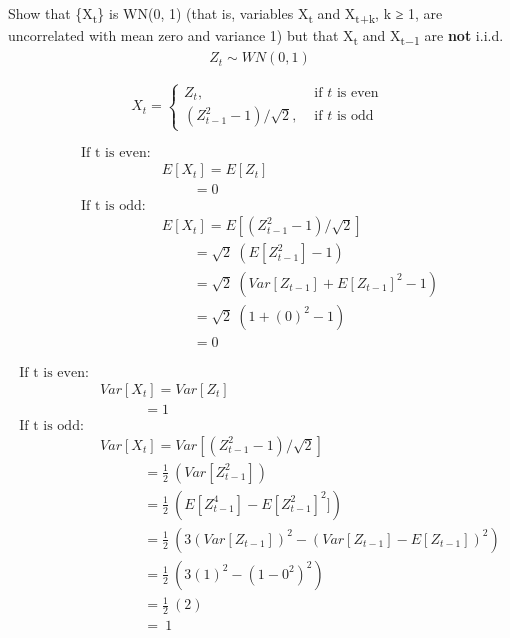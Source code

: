 \documentclass[
]{article}
\begin{document}
\setlength{\leftskip}{0cm}

Show that \{X\textsubscript{t}\} is WN(0, 1) (that is, variables
X\textsubscript{t} and X\textsubscript{t+k}, k ≥ 1, are uncorrelated
with mean zero and variance 1) but that X\textsubscript{t} and
X\textsubscript{t−1} are \textbf{not} i.i.d.\\

\[
\begin{align*}
Z_{t} \sim WN(0, 1)
\end{align*}
\]

\[
X_t= \begin{cases}Z_t, & \text { if } t \text { is even } \\ \left(Z_{t-1}^2-1\right) / \sqrt{2}, & \text { if } t \text { is odd }\end{cases}
\]

\[ 
\begin{align*}
\text{If t is even}:&\\
& E[X_{t}] = E[Z_{t}]\\
&\ \ \ \ \ \ \ \ \ \ = 0\\
\text{If t is odd}:&\\
& E[X_{t}] = E[(Z^2_{t-1}-1)/\sqrt{2}]\\
&\ \ \ \ \ \ \ \ \ \ = \sqrt{2}\ (E[Z^2_{t-1}]-1)\\
&\ \ \ \ \ \ \ \ \ \ = \sqrt{2}\ (Var[Z_{t-1}]+E[Z_{t-1}]^2-1)\\
&\ \ \ \ \ \ \ \ \ \ = \sqrt{2}\ (1+(0)^2-1)\\
&\ \ \ \ \ \ \ \ \ \ = 0
\end{align*}
\]

\[ 
\begin{align*}
\text{If t is even}:&\\
& Var[X_{t}] = Var[Z_{t}]\\
&\ \ \ \ \ \ \ \ \ \ \ \ \ \ = 1\\
\text{If t is odd}:&\\
& Var[X_{t}] = Var[(Z^2_{t-1}-1)/\sqrt{2}]\\
&\ \ \ \ \ \ \ \ \ \ \ \ \ \ = \frac{1}{2}\ (Var[Z^2_{t-1}])\\
&\ \ \ \ \ \ \ \ \ \ \ \ \ \ = \frac{1}{2}\ (E[Z_{t-1}^4]-E[Z^2_{t-1}]^2])\\
&\ \ \ \ \ \ \ \ \ \ \ \ \ \ = \frac{1}{2}\ (3(Var[Z_{t-1}])^2-(Var[Z_{t-1}]-E[Z_{t-1}])^2)\\
&\ \ \ \ \ \ \ \ \ \ \ \ \ \ = \frac{1}{2}\ (3(1)^2-(1-0^2)^2)\\
&\ \ \ \ \ \ \ \ \ \ \ \ \ \ = \frac{1}{2}\ (2)\\
&\ \ \ \ \ \ \ \ \ \ \ \ \ \ = \ 1\\
\end{align*}
\]
\end{document}
